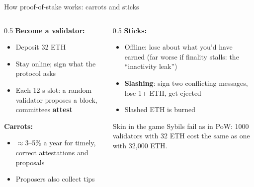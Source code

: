 \ifdefined\PRESENTATION\else\PassOptionsToClass{handout}{beamer}\fi\documentclass[aspectratio=169, lualatex]{beamer}
\begin{document}
\begin{frame}{How proof-of-stake works: carrots and sticks}
	\begin{columns}[c]
		\begin{column}{0.5\textwidth}
			\textbf{Become a validator:}
			\begin{itemize}
				\item Deposit 32 ETH
				\item Stay online; sign what the protocol asks
				\item Each 12 s slot: a random validator proposes a block, committees \textbf{attest}
			\end{itemize}
			\textbf{Carrots:}
			\begin{itemize}
				\item $\approx$3--5\% a year for timely, correct attestations and proposals
				\item Proposers also collect tips
			\end{itemize}
		\end{column}
		\begin{column}{0.5\textwidth}
			\textbf{Sticks:}
			\begin{itemize}
				\item Offline: lose about what you'd have earned (far worse if finality stalls: the ``inactivity leak'')
				\item \textbf{Slashing}: sign two conflicting messages, lose 1+ ETH, get ejected
				\item Slashed ETH is burned
			\end{itemize}
			\begin{alertblock}{Skin in the game}
				Sybils fail as in PoW: 1000 validators with 32 ETH cost the same as one with 32,000 ETH.
			\end{alertblock}
		\end{column}
	\end{columns}
\end{frame}
\end{document}
